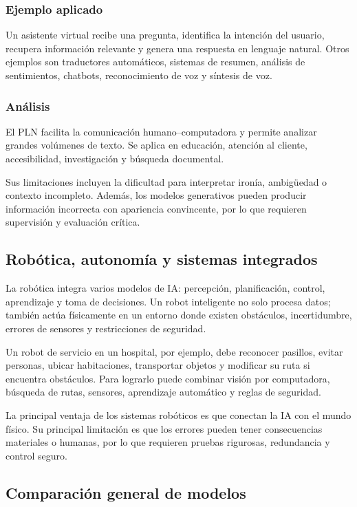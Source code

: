 \subsubsection{Ejemplo aplicado}

Un asistente virtual recibe una pregunta, identifica la intención del usuario, recupera información relevante y genera una respuesta en lenguaje natural. Otros ejemplos son traductores automáticos, sistemas de resumen, análisis de sentimientos, chatbots, reconocimiento de voz y síntesis de voz.

\subsubsection{Análisis}

El PLN facilita la comunicación humano--computadora y permite analizar grandes volúmenes de texto. Se aplica en educación, atención al cliente, accesibilidad, investigación y búsqueda documental.

Sus limitaciones incluyen la dificultad para interpretar ironía, ambigüedad o contexto incompleto. Además, los modelos generativos pueden producir información incorrecta con apariencia convincente, por lo que requieren supervisión y evaluación crítica.

\subsection{Robótica, autonomía y sistemas integrados}

La robótica integra varios modelos de IA: percepción, planificación, control, aprendizaje y toma de decisiones. Un robot inteligente no solo procesa datos; también actúa físicamente en un entorno donde existen obstáculos, incertidumbre, errores de sensores y restricciones de seguridad.

Un robot de servicio en un hospital, por ejemplo, debe reconocer pasillos, evitar personas, ubicar habitaciones, transportar objetos y modificar su ruta si encuentra obstáculos. Para lograrlo puede combinar visión por computadora, búsqueda de rutas, sensores, aprendizaje automático y reglas de seguridad.

La principal ventaja de los sistemas robóticos es que conectan la IA con el mundo físico. Su principal limitación es que los errores pueden tener consecuencias materiales o humanas, por lo que requieren pruebas rigurosas, redundancia y control seguro.

\subsection{Comparación general de modelos}

